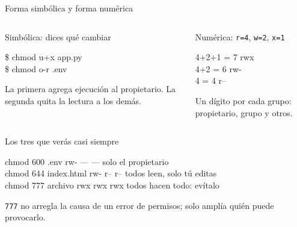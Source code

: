 \documentclass[aspectratio=169,10pt,c]{beamer}
\begin{document}
\begin{frame}{Forma simbólica y forma numérica}
\begin{columns}[T,onlytextwidth]
\begin{exampleblock}{Simbólica: dices qué cambiar}
\begin{terminal}
\$ chmod u+x app.py\\
\$ chmod o-r .env
\end{terminal}
\small La primera agrega ejecución al propietario. La segunda quita la lectura a los demás.
\end{exampleblock}
\begin{exampleblock}{Numérica: \texttt{r=4}, \texttt{w=2}, \texttt{x=1}}
\begin{terminal}
4+2+1 = 7  rwx\\
4+2   = 6  rw-\\
4     = 4  r--
\end{terminal}
\small Un dígito por cada grupo: propietario, grupo y otros.
\end{exampleblock}
\end{columns}
\begin{exampleblock}{Los tres que verás casi siempre}
\begin{terminal}\footnotesize
chmod 600 .env          rw- --- ---   solo el propietario\\
chmod 644 index.html    rw- r-- r--   todos leen, solo tú editas\\
chmod 777 archivo       rwx rwx rwx   todos hacen todo: evítalo
\end{terminal}
\small \texttt{777} no arregla la causa de un error de permisos; solo amplía quién puede provocarlo.
\end{exampleblock}
\end{frame}
\end{document}
